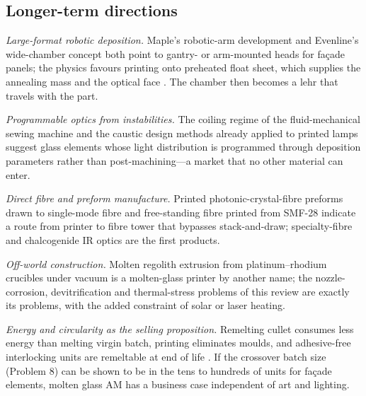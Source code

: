 \subsection{Longer-term directions}
\emph{Large-format robotic deposition.} Maple's robotic-arm development and Evenline's wide-chamber concept both point to gantry- or arm-mounted heads for fa\c{c}ade panels; the physics favours printing onto preheated float sheet, which supplies the annealing mass and the optical face \citep{stern2024cgc,maple_ammedia}. The chamber then becomes a lehr that travels with the part.

\emph{Programmable optics from instabilities.} The coiling regime of the fluid-mechanical sewing machine \citep{brun2017} and the caustic design methods already applied to printed lamps suggest glass elements whose light distribution is programmed through deposition parameters rather than post-machining---a market that no other material can enter.

\emph{Direct fibre and preform manufacture.} Printed photonic-crystal-fibre preforms drawn to single-mode fibre \citep{laval2023preform} and free-standing fibre printed from SMF-28 \citep{hostetler2018sff} indicate a route from printer to fibre tower that bypasses stack-and-draw; specialty-fibre and chalcogenide IR optics \citep{baudet2019} are the first products.

\emph{Off-world construction.} Molten regolith extrusion from platinum--rhodium crucibles under vacuum \citep{regolithreview2023,regolithvac2024} is a molten-glass printer by another name; the nozzle-corrosion, devitrification and thermal-stress problems of this review are exactly its problems, with the added constraint of solar or laser heating.

\emph{Energy and circularity as the selling proposition.} Remelting cullet consumes less energy than melting virgin batch, printing eliminates moulds, and adhesive-free interlocking units are remeltable at end of life \citep{stern2024cgc,mit2024masonry}. If the crossover batch size (Problem 8) can be shown to be in the tens to hundreds of units for fa\c{c}ade elements, molten glass AM has a business case independent of art and lighting.

